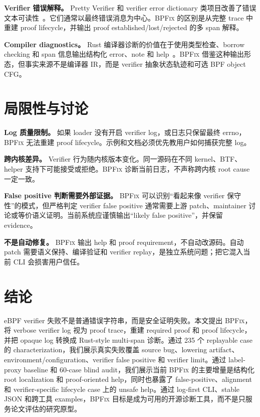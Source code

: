 \documentclass[letterpaper,twocolumn,10pt]{article}
\newcommand{\sys}{\textsc{BPFix}\xspace}
\begin{document}
\textbf{Verifier 错误解释。} Pretty Verifier 和 verifier error dictionary 类项目改善了错误文本可读性~\cite{prettyverifier2025,ebpfverifdict}。它们通常以最终错误消息为中心。\sys 的区别是从完整 trace 中重建 proof lifecycle，并输出 proof established/lost/rejected 的多 span 解释。

\textbf{Compiler diagnostics。} Rust 编译器诊断的价值在于使用类型检查、borrow checking 和 span 信息输出结构化 error、note 和 help~\cite{rustdiag2016,errormessages2014}。\sys 借鉴这种输出形态，但事实来源不是编译器 IR，而是 verifier 抽象状态轨迹和可选 BPF object CFG。

\section{局限性与讨论}

\textbf{Log 质量限制。} 如果 loader 没有开启 verifier log，或日志只保留最终 errno，\sys 无法重建 proof lifecycle。示例和文档必须优先教用户如何捕获完整 log。

\textbf{跨内核差异。} Verifier 行为随内核版本变化。同一源码在不同 kernel、BTF、helper 支持下可能接受或拒绝。\sys 诊断当前日志，不声称跨内核 root cause 一定一致。

\textbf{False positive 判断需要外部证据。} \sys 可以识别“看起来像 verifier 保守性”的模式，但严格判定 verifier false positive 通常需要上游 patch、maintainer 讨论或等价语义证明。当前系统应谨慎输出“likely false positive”，并保留 evidence。

\textbf{不是自动修复。} \sys 输出 help 和 proof requirement，不自动改源码。自动 patch 需要语义保持、编译验证和 verifier replay，是独立系统问题；把它混入当前 CLI 会损害用户信任。

\section{结论}

eBPF verifier 失败不是普通错误字符串，而是安全证明失败。本文提出 \sys，将 verbose verifier log 视为 proof trace，重建 required proof 和 proof lifecycle，并把 opaque log 转换成 Rust-style multi-span 诊断。通过 235 个 replayable case 的 characterization，我们展示真实失败覆盖 source bug、lowering artifact、environment/configuration、verifier false positive 和 verifier limit。通过 label-proxy baseline 和 60-case blind audit，我们展示当前 \sys 的主要增量是结构化 root localization 和 proof-oriented help，同时也暴露了 false-positive、alignment 和 verifier-specific lifecycle case 上的 unsafe help。通过 log-first CLI、stable JSON 和跨工具 examples，\sys 目标是成为可用的开源诊断工具，而不是只服务论文评估的研究原型。



\end{document}

